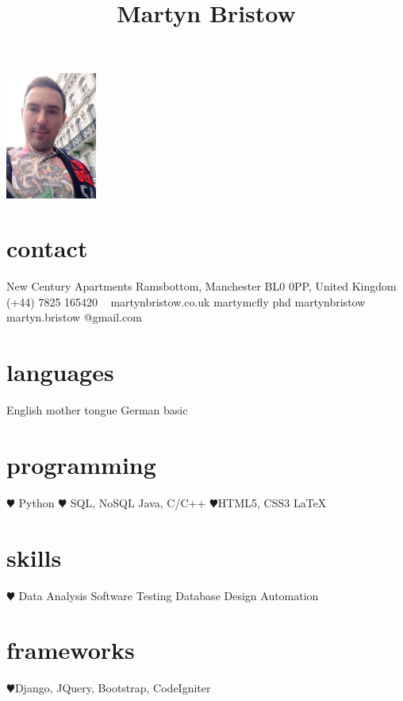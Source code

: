 \documentclass[]{cv-style}          %
\begin{document}
\lastupdated
\title{Martyn Bristow}


\begin{aside}
%
\includegraphics[width=3cm]{martyn.jpg}
\section{contact}
 New Century Apartments
\hspace*{25pt} Ramsbottom, Manchester
\hspace*{25pt} BL0 0PP,
\hspace*{25pt} United Kingdom
~
\faPhone (+44) 7825 165420
~
{\faGlobe martynbristow.co.uk}
{\faTwitter martymcfly phd}
{\faGithub martynbristow}
{\faEnvelope martyn.bristow
@gmail.com}
\section{languages}
English mother tongue
German basic
%
\section{programming}
{\color{red} $\varheartsuit$} Python
{\color{red} $\varheartsuit$} SQL, NoSQL
Java, C/C++
{\color{red} $\varheartsuit$}HTML5, CSS3 \LaTeX{}
\section{skills}
{\color{red} $\varheartsuit$} Data Analysis
Software Testing
Database Design
Automation
\section{frameworks}
{\color{red} $\varheartsuit$}Django, JQuery, Bootstrap, CodeIgniter

\end{aside}
\end{document}
